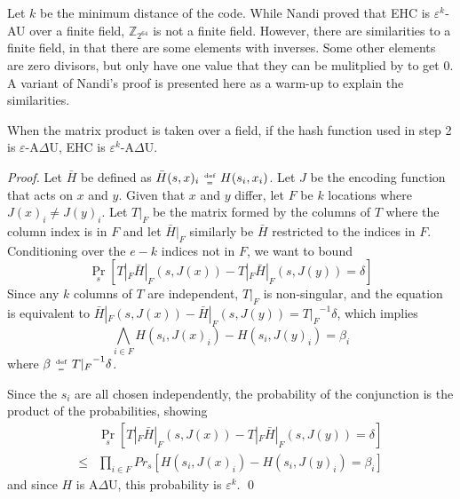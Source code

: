 \documentclass[runningheads]{llncs}
\newcommand{\ints}{\mathbb{Z}}
\newcommand{\defeq}{\;\genfrac{}{}{0pt}{2}{\text{def}}{=}\;}
\begin{document}

Let $k$ be the minimum distance of the code.
While Nandi proved that EHC is $\varepsilon^k$-AU over a finite field, $\ints_{2^{64}}$ is not a finite field.
However, there are similarities to a finite field, in that there are some elements with inverses.
Some other elements are zero divisors, but only have one value that they can be mulitplied by to get 0.
A variant of Nandi's proof is presented here as a warm-up to explain the similarities. \cite{ehc-nandi}

\begin{lemma}
  When the matrix product is taken over a field, if the hash function used in step 2 is $\varepsilon$-A$\Delta$U, EHC is $\varepsilon^k$-A$\Delta$U.
\end{lemma}
\begin{proof}
  Let $\bar{H}$ be defined as $\bar{H}(s, x)_i \defeq H(s_i, x_i)$.
  Let $J$ be the encoding function that acts on $x$ and $y$.
  Given that $x$ and $y$ differ, let $F$ be $k$ locations where $J(x)_i \neq J(y)_i$.
  Let $T|_F$ be the matrix formed by the columns of $T$ where the column index is in $F$ and let $\bar{H}|_F$ similarly be $\bar{H}$ restricted to the indices in $F$.
  Conditioning over the $e -k$ indices not in $F$, we want to bound
  \begin{equation}
    \label{ehc-delta}
    \Pr_s[T|_F \bar{H}|_F(s, J(x)) - T|_F \bar{H}|_F(s, J(y)) = \delta]
  \end{equation}
  Since any $k$ columns of $T$ are independent, $T|_F$ is non-singular, and the equation is equivalent to $\bar{H}|_F(s, J(x)) - \bar{H}|_F(s, J(y)) = {T|_F}^{-1} \delta$, which implies
  \[
  \bigwedge_{i \in F} H(s_i, J(x)_i) - H(s_i, J(y)_i) = \beta_i
  \]
  where $\beta \defeq {T|_F}^{-1} \delta$.

  Since the $s_i$ are all chosen independently, the probability of the conjunction is the product of the probabilities, showing
  \[
  \begin{array}{rl}
    &  \Pr_s[T|_F \bar{H}|_F (s,J(x)) - T|_F \bar{H}|_F(s,J(y)) = \delta] \\
  \leq &  \prod_{i \in F} Pr_s[H(s_i, J(x)_i) - H(s_i, J(y)_i) = \beta_i]
  \end{array}
  \]
  and since $H$ is A$\Delta$U, this probability is $\varepsilon^k$.  \qed
\end{proof}
\end{document}
